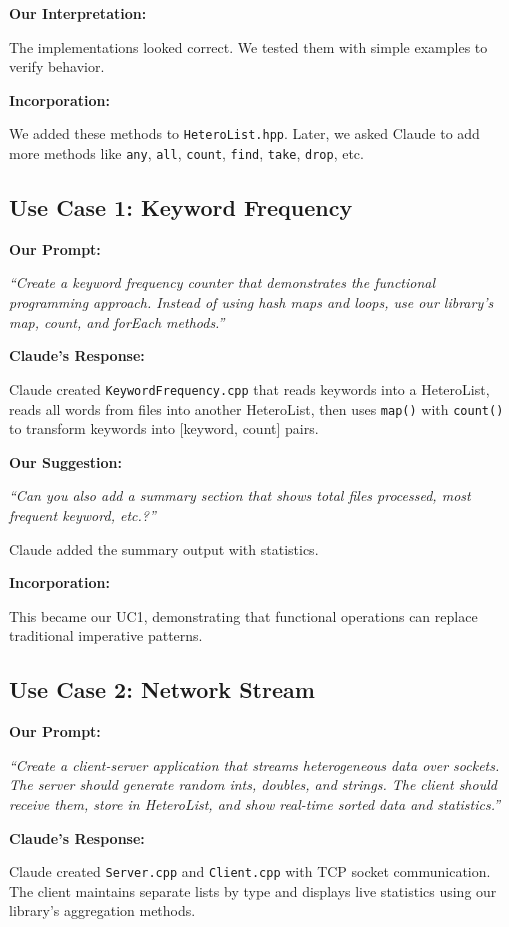 \documentclass[11pt,a4paper]{article}
\begin{document}
\textbf{Our Interpretation:}

The implementations looked correct. We tested them with simple examples to verify behavior.

\textbf{Incorporation:}

We added these methods to \texttt{HeteroList.hpp}. Later, we asked Claude to add more methods like \texttt{any}, \texttt{all}, \texttt{count}, \texttt{find}, \texttt{take}, \texttt{drop}, etc.

\subsection{Use Case 1: Keyword Frequency}

\textbf{Our Prompt:}

\textit{``Create a keyword frequency counter that demonstrates the functional programming approach. Instead of using hash maps and loops, use our library's map, count, and forEach methods.''}

\textbf{Claude's Response:}

Claude created \texttt{KeywordFrequency.cpp} that reads keywords into a HeteroList, reads all words from files into another HeteroList, then uses \texttt{map()} with \texttt{count()} to transform keywords into [keyword, count] pairs.

\textbf{Our Suggestion:}

\textit{``Can you also add a summary section that shows total files processed, most frequent keyword, etc.?''}

Claude added the summary output with statistics.

\textbf{Incorporation:}

This became our UC1, demonstrating that functional operations can replace traditional imperative patterns.

\subsection{Use Case 2: Network Stream}

\textbf{Our Prompt:}

\textit{``Create a client-server application that streams heterogeneous data over sockets. The server should generate random ints, doubles, and strings. The client should receive them, store in HeteroList, and show real-time sorted data and statistics.''}

\textbf{Claude's Response:}

Claude created \texttt{Server.cpp} and \texttt{Client.cpp} with TCP socket communication. The client maintains separate lists by type and displays live statistics using our library's aggregation methods.
\end{document}
